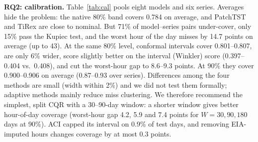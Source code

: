 \documentclass[conference]{IEEEtran}
\begin{document}
\begin{table}[t]
\caption{Test nMAE (normalized MAE of the median; solar daytime only) and mean native 80\% coverage. Bold: lowest per series; underlined: pinball loss not significantly worse than the best (DM, Holm, 5\%). The operator forecast is a point forecast with no native interval.}
\label{tab:acc}
\centering\footnotesize\setlength{\tabcolsep}{2.6pt}
\end{table}

\textbf{RQ2: calibration.} Table~\ref{tab:cal} pools eight models and six series. Averages hide the problem: the native 80\% band covers 0.784 on average, and PatchTST and TiRex are close to nominal. But 71\% of model--series pairs under-cover, only 15\% pass the Kupiec test, and the worst hour of the day misses by 14.7 points on average (up to 43). At the same 80\% level, conformal intervals cover 0.801--0.807, are only 6\% wider, score slightly better on the interval (Winkler) score (0.397--0.404 vs.\ 0.408), and cut the worst-hour gap to 8.6--9.3 points. At 90\% they cover 0.900--0.906 on average (0.87--0.93 over series). Differences among the four methods are small (width within 2\%) and we did not test them formally; adaptive methods mainly reduce miss clustering. We therefore recommend the simplest, split CQR with a 30--90-day window: a shorter window gives better hour-of-day coverage (worst-hour gap 4.2, 5.9 and 7.4 points for $W=30,90,180$ days at 90\%). ACI capped its interval on 0.9\% of test days, and removing EIA-imputed hours changes coverage by at most 0.3 points.
\end{document}
